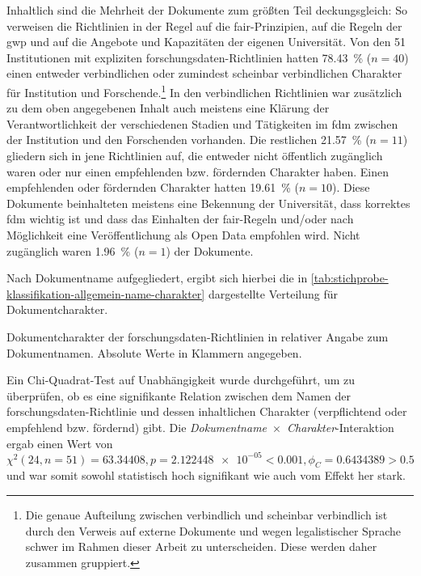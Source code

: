 Inhaltlich sind die Mehrheit der Dokumente zum größten Teil deckungsgleich:
So verweisen die Richtlinien in der Regel auf die \gls{fair}-Prinzipien, auf die Regeln der \gls{gwp} und auf die Angebote und Kapazitäten der eigenen Universität.
Von den \num{51} Institutionen mit expliziten \gls{forschungsdaten}-Richtlinien hatten \SI{78,43}{\percent} ($n=\num{40}$) einen entweder verbindlichen oder zumindest scheinbar verbindlichen Charakter für Institution und Forschende.\footnote{Die genaue Aufteilung zwischen verbindlich und scheinbar verbindlich ist durch den Verweis auf externe Dokumente und wegen legalistischer Sprache schwer im Rahmen dieser Arbeit zu unterscheiden. Diese werden daher zusammen gruppiert.}
In den verbindlichen Richtlinien war zusätzlich zu dem oben angegebenen Inhalt auch meistens eine Klärung der Verantwortlichkeit der verschiedenen Stadien und Tätigkeiten im \gls{fdm} zwischen der Institution und den Forschenden vorhanden.
Die restlichen \SI{21,57}{\percent} ($n=\num{11}$) gliedern sich in jene Richtlinien auf, die entweder nicht öffentlich zugänglich waren oder nur einen empfehlenden bzw. fördernden Charakter haben.
Einen empfehlenden oder fördernden Charakter hatten \SI{19,61}{\percent} ($n=\num{10}$).
Diese Dokumente beinhalteten meistens eine Bekennung der Universität, dass korrektes \gls{fdm} wichtig ist und dass das Einhalten der \gls{fair}-Regeln und/oder nach Möglichkeit eine Veröffentlichung als Open Data empfohlen wird.
Nicht zugänglich waren \SI{1,96}{\percent} ($n=\num{1}$) der Dokumente.

Nach Dokumentname aufgegliedert, ergibt sich hierbei die in \cref{tab:stichprobe-klassifikation-allgemein-name-charakter} dargestellte Verteilung für Dokumentcharakter.
\begin{table}[!htbp]
	\caption{Dokumentcharakter der \gls{forschungsdaten}-Richtlinien in relativer Angabe zum Dokumentnamen. Absolute Werte in Klammern angegeben.}
    
	\label{tab:stichprobe-klassifikation-allgemein-name-charakter}
\end{table}

Ein Chi-Quadrat-Test auf Unabhängigkeit wurde durchgeführt, um zu überprüfen, ob es eine signifikante Relation zwischen dem Namen der \gls{forschungsdaten}-Richtlinie und dessen inhaltlichen Charakter (verpflichtend oder empfehlend bzw. fördernd) gibt.
Die \textit{Dokumentname}~$\times$~\textit{Charakter}-Interaktion ergab einen Wert von $\chi^2 (\num{24}, n=\num{51}) = \num[round-mode=places,round-precision=2]{63,34408}, p = \num[round-mode=places,round-precision=2]{2,122448e-05}<\num{0.001}, \phi_C=\num[round-mode=places,round-precision=2]{0.6434389}>\num{0.5}$ und war somit sowohl statistisch hoch signifikant wie auch vom Effekt her stark.


